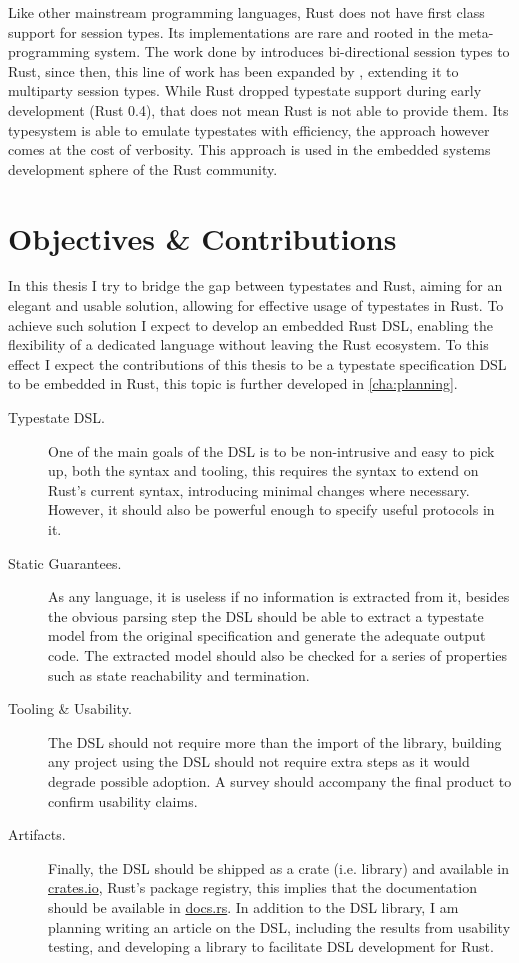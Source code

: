 Like other mainstream programming languages, Rust does not have first class support for session types.
Its implementations are rare and rooted in the meta-programming system.
The work done by \autocite{Jespersen2015, Munksgaard2015} introduces bi-directional session types to Rust,
since then, this line of work has been expanded by \autocite{Lagaillardie2020},
extending it to multiparty session types.
While Rust dropped typestate support during early development (Rust 0.4), that does not mean Rust is not able to provide them.
Its typesystem is able to emulate typestates with efficiency, the approach however comes at the cost of verbosity.
This approach is used in the embedded systems development sphere of the Rust community.


\section{Objectives \& Contributions}\label{sec:objectives}

In this thesis I try to bridge the gap between typestates and Rust,
aiming for an elegant and usable solution, allowing for effective usage of typestates in Rust.
To achieve such solution I expect to develop an embedded Rust DSL,
enabling the flexibility of a dedicated language without leaving the Rust ecosystem.
To this effect I expect the contributions of this thesis to be a typestate specification DSL to be embedded in Rust,
this topic is further developed in \autoref{cha:planning}.

\begin{description}
    \item[Typestate DSL.] One of the main goals of the DSL is to be non-intrusive and easy to pick up, both the syntax and tooling,
          this requires the syntax to extend on Rust's current syntax, introducing minimal changes where necessary.
          However, it should also be powerful enough to specify useful protocols in it.
    \item[Static Guarantees.] As any language, it is useless if no information is extracted from it,
          besides the obvious parsing step the DSL should be able to extract a typestate model from the original specification
          and generate the adequate output code.
          The extracted model should also be checked for a series of properties such as state reachability and termination.
    \item[Tooling \& Usability.] The DSL should not require more than the import of the library,
          building any project using the DSL should not require extra steps as it would degrade possible adoption.
          A survey should accompany the final product to confirm usability claims.
    \item[Artifacts.] Finally, the DSL should be shipped as a crate (i.e. library) and available in \url{crates.io}, Rust's package registry,
          this implies that the documentation should be available in \url{docs.rs}.
          In addition to the DSL library, I am planning writing an article on the DSL, including the results from usability testing,
          and developing a library to facilitate DSL development for Rust.
\end{description}

